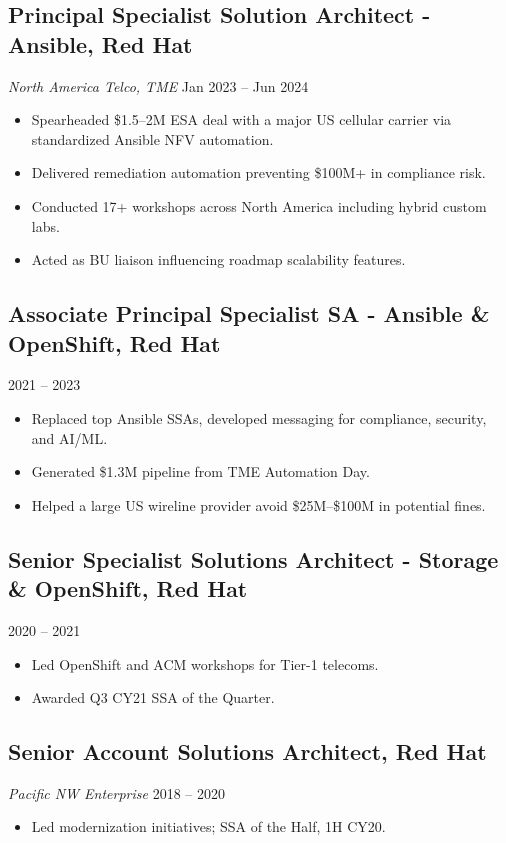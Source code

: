 \documentclass[11pt]{article}
\begin{document}
\subsection{Principal Specialist Solution Architect - Ansible, Red Hat}
\textit{North America Telco, TME} \hfill Jan 2023 -- Jun 2024
\begin{itemize}[leftmargin=*]
    \item Spearheaded \$1.5--2M ESA deal with a major US cellular carrier via standardized Ansible NFV automation.
    \item Delivered remediation automation preventing \$100M+ in compliance risk.
    \item Conducted 17+ workshops across North America including hybrid custom labs.
    \item Acted as BU liaison influencing roadmap scalability features.
\end{itemize}

\subsection{Associate Principal Specialist SA - Ansible \& OpenShift, Red Hat}
\hfill 2021 -- 2023
\begin{itemize}[leftmargin=*]
    \item Replaced top Ansible SSAs, developed messaging for compliance, security, and AI/ML.
    \item Generated \$1.3M pipeline from TME Automation Day.
    \item Helped a large US wireline provider avoid \$25M--\$100M in potential fines.
\end{itemize}

\subsection{Senior Specialist Solutions Architect - Storage \& OpenShift, Red Hat}
\hfill 2020 -- 2021
\begin{itemize}[leftmargin=*]
    \item Led OpenShift and ACM workshops for Tier-1 telecoms.
    \item Awarded Q3 CY21 SSA of the Quarter.
\end{itemize}

\subsection{Senior Account Solutions Architect, Red Hat}
\textit{Pacific NW Enterprise} \hfill 2018 -- 2020
\begin{itemize}[leftmargin=*]
    \item Led modernization initiatives; SSA of the Half, 1H CY20.
\end{itemize}
\end{document}
